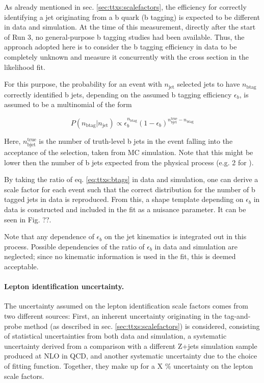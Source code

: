 As already mentioned in sec. \ref{sec:ttxs:scalefactors}, the efficiency for correctly identifying a jet originating from a b quark (b tagging) is expected to be different in data and simulation. At the time of this measurement, directly after the start of Run 3, no general-purpose b tagging studies had been available. Thus, the approach adopted here is to consider the b tagging efficiency in data to be completely unknown and measure it concurrently with the cross section in the likelihood fit.

For this purpose, the probability for an event with $n_{\mathrm{jet}}$ selected jets to have $n_{\mathrm{b tag}}$ correctly identified b jets, depending on the assumed b tagging efficiency $\epsilon_b$, is assumed to be a multinomial of the form

\begin{equation}
\label{eq:ttxs:btags}
    P (n_{\mathrm{b tag}} | n_{\mathrm{jet}}) \propto \epsilon_b^{n_{\mathrm{b tag}}} (1 - \epsilon_b)^{n_{\mathrm{b jet}}^{\mathrm{true}} - n_{\mathrm{b tag}}}
\end{equation}

Here, $n_{\mathrm{b jet}}^{\mathrm{true}}$ is the number of truth-level b jets in the event falling into the acceptance of the selection, taken from MC simulation. Note that this might be lower then the number of b jets expected from the physical process (e.g. 2 for \ttbar). 

By taking the ratio of eq. \ref{eq:ttxs:btags} in data and simulation, one can derive a scale factor for each event such that the correct distribution for the number of b tagged jets in data is reproduced. From this, a shape template depending on $\epsilon_b$ in data is constructed and included in the fit as a nuisance parameter. It can be seen in Fig. ??.

Note that any dependence of $\epsilon_b$ on the jet kinematics is integrated out in this process. Possible dependencies of the ratio of $\epsilon_b$ in data and simulation are neglected; since no kinematic information is used in the fit, this is deemed acceptable.

\paragraph{Lepton identification uncertainty.}


The uncertainty assumed on the lepton identification scale factors comes from two different sources: First, an inherent uncertainty originating in the tag-and-probe method (as described in sec. \ref{sec:ttxs:scalefactors}) is considered, consisting of statistical uncertainties from both data and simulation, a systematic uncertainty derived from a comparison with a different Z+jets simulation sample produced at NLO in QCD, and another systematic uncertainty due to the choice of fitting function. Together, they make up for a X \% uncertainty on the lepton scale factors.

